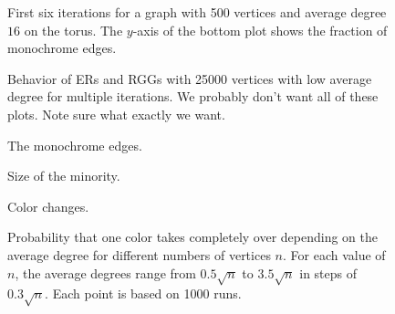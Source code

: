\documentclass[review]{elsarticle}
\begin{document}
\begin{figure}
  
  \caption{First six iterations for a graph with \num{500} vertices
    and average degree $16$ on the torus.  The $y$-axis of the bottom
    plot shows the fraction of monochrome edges.}
\end{figure}

\begin{figure}
  \centering
  
  \caption{Behavior of ERs and RGGs with \num{25000} vertices with low
    average degree for multiple iterations.  We probably don't want
    all of these plots.  Note sure what exactly we want.}
\end{figure}

\begin{figure}
  \centering
  
  \caption{The monochrome edges.}
\end{figure}

\begin{figure}
  \centering
  
  \caption{Size of the minority.}
\end{figure}

\begin{figure}
  \centering
  
  \caption{Color changes.}
\end{figure}


\begin{figure}
  \centering
  
  \caption{Probability that one color takes completely over depending
    on the average degree for different numbers of vertices $n$.  For
    each value of $n$, the average degrees range from $0.5\sqrt{n}$ to
    $3.5\sqrt{n}$ in steps of $0.3\sqrt{n}$.  Each point is based on
    \num{1000} runs.}
\end{figure}
\end{document}
